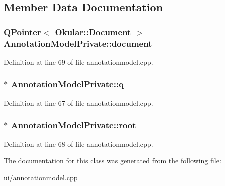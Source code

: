 \subsection{Member Data Documentation}
\hypertarget{classAnnotationModelPrivate_ad9d0730baf8663b0c3485d72ac4e05c6}{
\subsubsection[{document}]{\setlength{\rightskip}{0pt plus 5cm}Q\+Pointer$<$ {\bf Okular\+::\+Document} $>$ Annotation\+Model\+Private\+::document}}\label{classAnnotationModelPrivate_ad9d0730baf8663b0c3485d72ac4e05c6}


Definition at line 69 of file annotationmodel.\+cpp.

\hypertarget{classAnnotationModelPrivate_a106e8bd7ef602e10239b11d4a775647d}{
\subsubsection[{q}]{$\ast$ Annotation\+Model\+Private\+::q}}\label{classAnnotationModelPrivate_a106e8bd7ef602e10239b11d4a775647d}


Definition at line 67 of file annotationmodel.\+cpp.

\hypertarget{classAnnotationModelPrivate_a35aef72ee0aebe05b6e0fa2c50c19f75}{
\subsubsection[{root}]{$\ast$ Annotation\+Model\+Private\+::root}}\label{classAnnotationModelPrivate_a35aef72ee0aebe05b6e0fa2c50c19f75}


Definition at line 68 of file annotationmodel.\+cpp.



The documentation for this class was generated from the following file\+:\begin{DoxyCompactItemize}
\item 
ui/\hyperlink{annotationmodel_8cpp}{annotationmodel.\+cpp}\end{DoxyCompactItemize}
